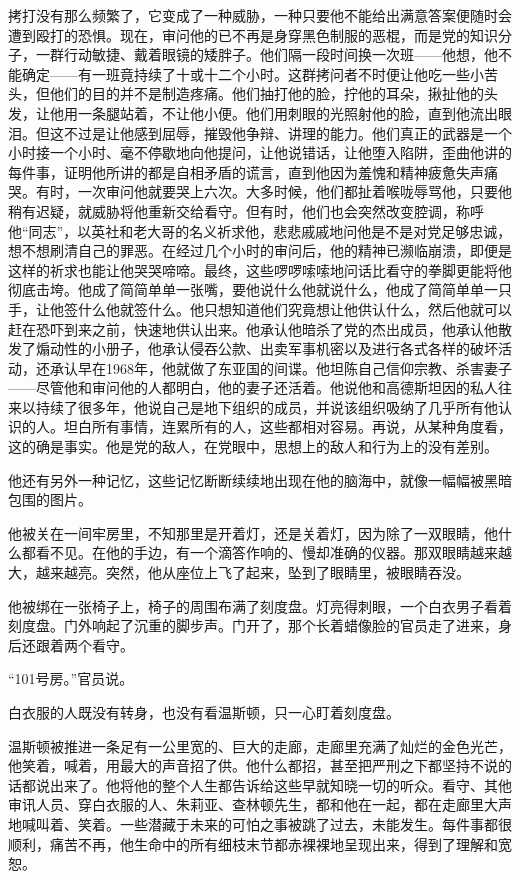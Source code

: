 拷打没有那么频繁了，它变成了一种威胁，一种只要他不能给出满意答案便随时会遭到殴打的恐惧。现在，审问他的已不再是身穿黑色制服的恶棍，而是党的知识分子，一群行动敏捷、戴着眼镜的矮胖子。他们隔一段时间换一次班——他想，他不能确定——有一班竟持续了十或十二个小时。这群拷问者不时便让他吃一些小苦头，但他们的目的并不是制造疼痛。他们抽打他的脸，拧他的耳朵，揪扯他的头发，让他用一条腿站着，不让他小便。他们用刺眼的光照射他的脸，直到他流出眼泪。但这不过是让他感到屈辱，摧毁他争辩、讲理的能力。他们真正的武器是一个小时接一个小时、毫不停歇地向他提问，让他说错话，让他堕入陷阱，歪曲他讲的每件事，证明他所讲的都是自相矛盾的谎言，直到他因为羞愧和精神疲惫失声痛哭。有时，一次审问他就要哭上六次。大多时候，他们都扯着喉咙辱骂他，只要他稍有迟疑，就威胁将他重新交给看守。但有时，他们也会突然改变腔调，称呼他``同志''，以英社和老大哥的名义祈求他，悲悲戚戚地问他是不是对党足够忠诚，想不想刷清自己的罪恶。在经过几个小时的审问后，他的精神已濒临崩溃，即便是这样的祈求也能让他哭哭啼啼。最终，这些啰啰嗦嗦地问话比看守的拳脚更能将他彻底击垮。他成了简简单单一张嘴，要他说什么他就说什么，他成了简简单单一只手，让他签什么他就签什么。他只想知道他们究竟想让他供认什么，然后他就可以赶在恐吓到来之前，快速地供认出来。他承认他暗杀了党的杰出成员，他承认他散发了煽动性的小册子，他承认侵吞公款、出卖军事机密以及进行各式各样的破坏活动，还承认早在1968年，他就做了东亚国的间谍。他坦陈自己信仰宗教、杀害妻子——尽管他和审问他的人都明白，他的妻子还活着。他说他和高德斯坦因的私人往来以持续了很多年，他说自己是地下组织的成员，并说该组织吸纳了几乎所有他认识的人。坦白所有事情，连累所有的人，这些都相对容易。再说，从某种角度看，这的确是事实。他是党的敌人，在党眼中，思想上的敌人和行为上的没有差别。

他还有另外一种记忆，这些记忆断断续续地出现在他的脑海中，就像一幅幅被黑暗包围的图片。

他被关在一间牢房里，不知那里是开着灯，还是关着灯，因为除了一双眼睛，他什么都看不见。在他的手边，有一个滴答作响的、慢却准确的仪器。那双眼睛越来越大，越来越亮。突然，他从座位上飞了起来，坠到了眼睛里，被眼睛吞没。

他被绑在一张椅子上，椅子的周围布满了刻度盘。灯亮得刺眼，一个白衣男子看着刻度盘。门外响起了沉重的脚步声。门开了，那个长着蜡像脸的官员走了进来，身后还跟着两个看守。

``101号房。''官员说。

白衣服的人既没有转身，也没有看温斯顿，只一心盯着刻度盘。

温斯顿被推进一条足有一公里宽的、巨大的走廊，走廊里充满了灿烂的金色光芒，他笑着，喊着，用最大的声音招了供。他什么都招，甚至把严刑之下都坚持不说的话都说出来了。他将他的整个人生都告诉给这些早就知晓一切的听众。看守、其他审讯人员、穿白衣服的人、朱莉亚、查林顿先生，都和他在一起，都在走廊里大声地喊叫着、笑着。一些潜藏于未来的可怕之事被跳了过去，未能发生。每件事都很顺利，痛苦不再，他生命中的所有细枝末节都赤裸裸地呈现出来，得到了理解和宽恕。

